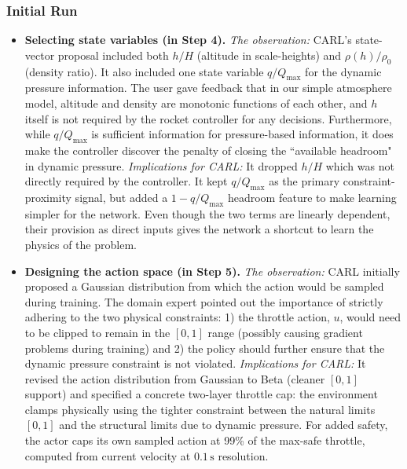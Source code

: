 \documentclass[mnsc,sglanonrev]{informs4}
\begin{document}
\subsubsection{Initial Run}
%
\begin{itemize}
\item \textbf{Selecting state variables (in Step 4).} 
\emph{The observation:} CARL's state-vector proposal included both $h/H$ (altitude in scale-heights) and $\rho(h)/\rho_0$ (density ratio). It also included one state variable $q/Q_{\max}$ for the dynamic pressure information. The user gave feedback that in our simple atmosphere model, altitude and density are monotonic functions of each other, and $h$ itself is not required by the rocket controller for any decisions. Furthermore, while $q/Q_{\max}$ is sufficient information for pressure-based information, it does make the controller discover the penalty of closing the ``available headroom" in dynamic pressure. \emph{Implications for CARL:} It dropped $h/H$ which was not directly required by the controller. It kept $q/Q_{\max}$ as the primary constraint-proximity signal, but added a $1-q/Q_{\max}$ headroom feature to make learning simpler for the network. Even though the two terms are linearly dependent, their provision as direct inputs gives the network a shortcut to learn the physics of the problem.

\item \textbf{Designing the action space (in Step 5).}
\emph{The observation:} CARL initially proposed a Gaussian distribution from which the action would be sampled during training. The domain expert pointed out the importance of strictly adhering to the two physical constraints: 1) the throttle action, $u$, would need to be clipped to remain in the $[0,1]$ range (possibly causing gradient problems during training) and 2) the policy should further ensure that the dynamic pressure constraint is not violated. \emph{Implications for CARL:} It revised the action distribution from Gaussian to Beta (cleaner $[0,1]$ support) and specified a concrete two-layer throttle cap: the environment clamps physically using the tighter constraint between the natural limits $[0,1]$ and the structural limits due to dynamic pressure. For added safety, the actor caps its own sampled action at 99\% of the max-safe throttle, computed from current velocity at $0.1\,\mathrm{s}$ resolution.


\end{itemize}
\end{document}
